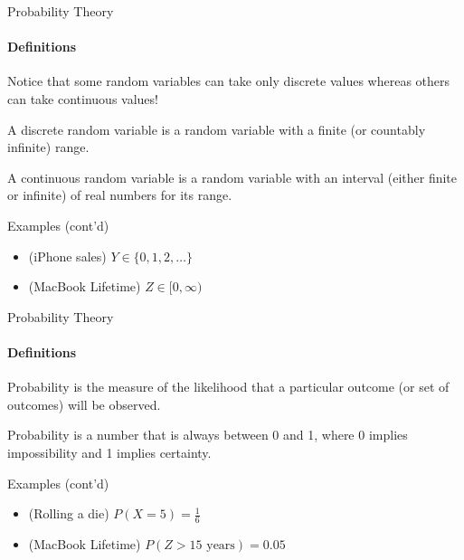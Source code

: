 \documentclass{beamer}\usepackage[]{graphicx}\usepackage[]{color}
\begin{document}
\begin{darkframes}
    

    \begin{frame}[label=lists]{Probability Theory}
		\framesubtitle{Definitions}    
		Notice that some random variables can take only discrete values whereas others can take continuous values!  	
      	
      	\begin{definition}
       		A \alert{discrete random variable} is a random variable with a finite (or countably infinite) range. 
       		
       		A \alert{continuous random variable} is a random variable with an interval (either finite or infinite) of real numbers for its range.
      	\end{definition}
    
    
    	\begin{exampleblock}{Examples (cont'd)}
      		\begin{itemize}

				\item (iPhone sales) $ Y \in  \{ 0, 1,2,\ldots \}$ 
				\item (MacBook Lifetime) $ Z \in [0,\infty) $

			\end{itemize}
        \end{exampleblock}
  
	\end{frame}  
	
	
	
	
	\begin{frame}[label=lists]{Probability Theory}
		\framesubtitle{Definitions}    
		
      	\begin{definition}
       		\alert{Probability} is the measure of the likelihood that a particular outcome (or set of outcomes) will be observed. \newline
       		
       		Probability is a number that is always between 0 and 1, where 0 implies impossibility and 1 implies certainty.
      	\end{definition}
    
    
    	\begin{exampleblock}{Examples (cont'd)}
      		\begin{itemize}

				\item (Rolling a die) $ P(X=5) = \frac{1}{6} $ 
				\item (MacBook Lifetime) $ P(Z>15\text{ years})  = 0.05$


\end{itemize}
\end{exampleblock}
\end{frame}
\end{darkframes}
\end{document}
